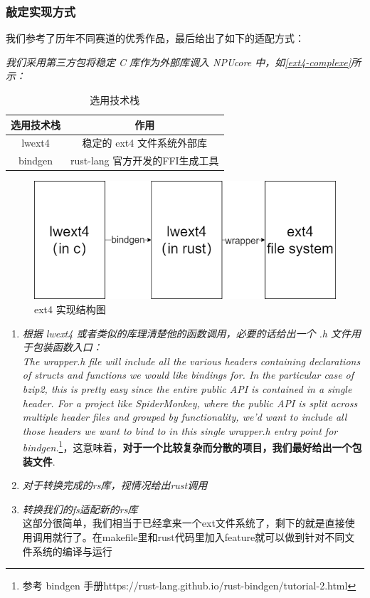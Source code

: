 \subsubsection{敲定实现方式}

我们参考了历年不同赛道的优秀作品，最后给出了如下的适配方式：

\textit{我们采用第三方包将稳定 C 库作为外部库调入 NPUcore 中，如\autoref{ext4-complexe}所示：}

\begin{table}[htbp]
    \centering
    \begin{tabular}{|c|c|}
        \hline
        选用技术栈 & 作用 \\
        \hline
        lwext4 & 稳定的 ext4 文件系统外部库 \\
        bindgen & rust-lang 官方开发的FFI生成工具 \\
        \hline
    \end{tabular}
    \caption{选用技术栈}
\end{table}


\begin{figure}
    \centering
    \includegraphics[width=0.6\linewidth]{figs/plan-ext.png}
    \caption{ext4 实现结构图}
    \label{ext4-complexe}
\end{figure}

\begin{enumerate}
    \item \textit{根据 lwext4 或者类似的库理清楚他的函数调用，必要的话给出一个 .h 文件用于包装函数入口：} \\ \textit{The wrapper.h file will include all the various headers containing declarations of structs and functions we would like bindings for. In the particular case of bzip2, this is pretty easy since the entire public API is contained in a single header. For a project like SpiderMonkey, where the public API is split across multiple header files and grouped by functionality, we'd want to include all those headers we want to bind to in this single wrapper.h entry point for bindgen.}\footnote{参考 bindgen 手册https://rust-lang.github.io/rust-bindgen/tutorial-2.html}，这意味着，\textbf{对于一个比较复杂而分散的项目，我们最好给出一个包装文件}.
    \item \textit{对于转换完成的rs库，视情况给出rust调用}
    \item \textit{转换我们的fs适配新的rs库} \\ 这部分很简单，我们相当于已经拿来一个ext文件系统了，剩下的就是直接使用调用就行了。在makefile里和rust代码里加入feature就可以做到针对不同文件系统的编译与运行
\end{enumerate}

